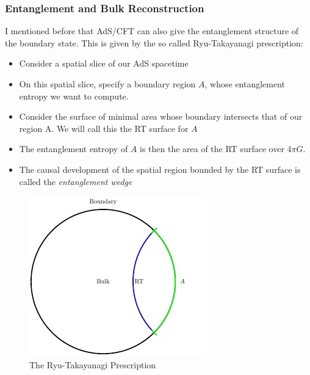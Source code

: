 \documentclass[8pt,aspectratio=169]{beamer}
\begin{document}
\begin{frame}
\frametitle{Entanglement and Bulk Reconstruction}

I mentioned before that AdS/CFT can also give the entanglement structure of the boundary state. This is given by the so called Ryu-Takayanagi prescription: 

\begin{minipage}[t]{0.55\linewidth}

\begin{itemize}

\item Consider a spatial slice of our AdS spacetime

\item On this spatial slice, specify a boundary region $A$, whose entanglement entropy we want to compute. 

\item Consider the surface of minimal area whose boundary intersects that of our region A. We will call this the RT surface for $A$

\item The entanglement entropy of $A$ is then the area of the RT surface over $4\pi G$.

\item The causal development of the spatial region bounded by the RT surface is called the \textit{entanglement wedge}

\end{itemize}

\end{minipage}\hfill
%
\begin{minipage}[t]{0.44\linewidth}

\begin{figure}
    \begin{center}
    
        \includegraphics[scale=1]{RT}    
    
    \end{center}
    \caption{The Ryu-Takayanagi Prescription}
    \label{fig:WDW}
\end{figure}

\end{minipage}

\end{frame}
\end{document}
